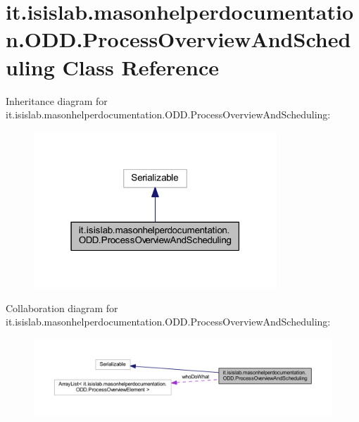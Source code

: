 \hypertarget{classit_1_1isislab_1_1masonhelperdocumentation_1_1_o_d_d_1_1_process_overview_and_scheduling}{\section{it.\-isislab.\-masonhelperdocumentation.\-O\-D\-D.\-Process\-Overview\-And\-Scheduling Class Reference}
\label{classit_1_1isislab_1_1masonhelperdocumentation_1_1_o_d_d_1_1_process_overview_and_scheduling}
}


Inheritance diagram for it.\-isislab.\-masonhelperdocumentation.\-O\-D\-D.\-Process\-Overview\-And\-Scheduling\-:\nopagebreak
\begin{figure}[H]
\begin{center}
\leavevmode
\includegraphics[width=259pt]{classit_1_1isislab_1_1masonhelperdocumentation_1_1_o_d_d_1_1_process_overview_and_scheduling__inherit__graph}
\end{center}
\end{figure}


Collaboration diagram for it.\-isislab.\-masonhelperdocumentation.\-O\-D\-D.\-Process\-Overview\-And\-Scheduling\-:\nopagebreak
\begin{figure}[H]
\begin{center}
\leavevmode
\includegraphics[width=350pt]{classit_1_1isislab_1_1masonhelperdocumentation_1_1_o_d_d_1_1_process_overview_and_scheduling__coll__graph}
\end{center}
\end{figure}
